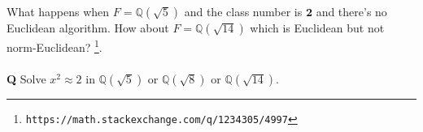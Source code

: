 \documentclass[12pt]{article}
\begin{document}
\noindent What happens when $F = \mathbb{Q}(\sqrt{5})$ and the class number is $\mathbf{2}$ and there's no Euclidean algorithm.    How about $F = \mathbb{Q}(\sqrt{14})$ which is Euclidean but not norm-Euclidean? \footnote{\texttt{https://math.stackexchange.com/q/1234305/4997}}. \\ \\
\textbf{Q} Solve $x^2 \approx 2$ in $\mathbb{Q}(\sqrt{5})$ or $\mathbb{Q}(\sqrt{8})$ or $\mathbb{Q}(\sqrt{14})$.  
\end{document}

